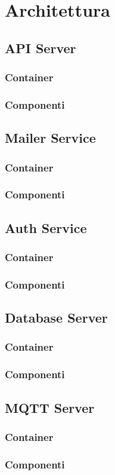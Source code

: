 \chapter{Architettura}

\section{API Server}
\subsection{Container}
\subsection{Componenti}

\section{Mailer Service}
\subsection{Container}
\subsection{Componenti}

\section{Auth Service}
\subsection{Container}
\subsection{Componenti}

\section{Database Server}
\subsection{Container}
\subsection{Componenti}

\section{MQTT Server}
\subsection{Container}
\subsection{Componenti}

